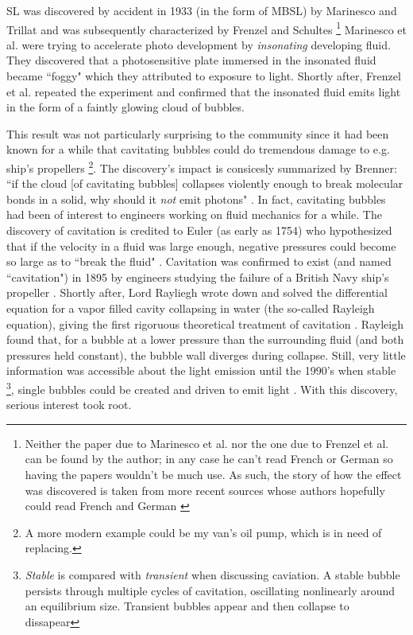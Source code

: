 \documentclass[rmp,aps,nofootinbib,superscriptaddress,floatfix]{revtex4-2}
\begin{document}
SL was discovered by accident in 1933 (in the form of MBSL) by Marinesco and Trillat \cite{marinesco1933actions} and was subsequently characterized by Frenzel and Schultes \cite{frenzel1934luminescenz} \footnote{Neither the paper due to Marinesco et al. nor the one due to Frenzel et al. can be found by the author; in any case he can't read French or German so having the papers wouldn't be much use. As such, the story of how the effect was discovered is taken from more recent sources whose authors hopefully could read French and German \cite{brenner2002single,gaitan1990experimental,crum1994sonoluminescence}} Marinesco et al. were trying to accelerate photo development by \emph{insonating} developing fluid. They discovered that a photosensitive plate immersed in the insonated fluid became ``foggy" which they attributed to exposure to light. Shortly after, Frenzel et al. repeated the experiment and confirmed that the insonated fluid emits light in the form of a faintly glowing cloud of bubbles. 

This result was not particularly surprising to the community since it had been known for a while that cavitating bubbles could do tremendous damage to e.g. ship's propellers \footnote{A more modern example could be my van's oil pump, which is in need of replacing.}. The discovery's impact is consicesly summarized by Brenner: ``if the cloud [of cavitating bubbles] collapses violently enough to break molecular bonds in a solid, why should it \emph{not} emit photons" \cite{brenner2002single}. In fact, cavitating bubbles had been of interest to engineers working on fluid mechanics for a while. The discovery of cavitation is credited to Euler (as early as 1754) who hypothesized that if the velocity in a fluid was large enough, negative pressures could become so large as to ``break the fluid" \cite{li2015introduction,gaitan1992sonoluminescence}. Cavitation was confirmed to exist (and named ``cavitation") in 1895 by engineers studying the failure of a British Navy ship's propeller \cite{li2015introduction}. Shortly after, Lord Rayliegh wrote down and solved the differential equation for a vapor filled cavity collapsing in water (the so-called Rayleigh equation), giving the first rigoruous theoretical treatment of cavitation \cite{rayleigh1917pressure,plesset1977bubble}. Rayleigh found that, for a bubble at a lower pressure than the surrounding fluid (and both pressures held constant), the bubble wall diverges during collapse. Still, very little information was accessible about the light emission until the 1990's when stable \footnote{\emph{Stable} is compared with \emph{transient} when discussing caviation. A stable bubble persists through multiple cycles of cavitation, oscillating nonlinearly around an equilibrium size. Transient bubbles appear and then collapse to dissapear}, single bubbles could be created and driven to emit light \cite{gaitan1990experimental,gaitan1992sonoluminescence,crum1994sonoluminescence}. With this discovery, serious interest took root. 
\end{document}
